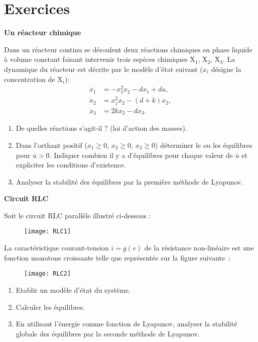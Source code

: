 \section{Exercices}

\begin{exercice}{\bf Un réacteur chimique}

Dans un réacteur continu se déroulent deux réactions chimiques en phase liquide à volume constant faisant intervenir trois espèces chimiques X$_1$, X$_2$, X$_3$. La dynamique du réacteur est décrite par le modèle d'état suivant ($x_i$ désigne la concentration de X$_i$):
\begin{align*}
\dot x_1 &= -x_1^2x_2 - dx_1 + du, \\
\dot x_2 &= x_1^2x_2 - (d+k)x_2, \\
\dot x_3 &= 2kx_2 - dx_3.
\end{align*}
\begin{enumerate}
\item De quelles réactions s'agit-il ? (loi d'action des masses). 
\item Dans l'orthant positif ($x_1 \geq 0$, $x_2 \geq 0$, $x_3 \geq 0$) déterminer le ou les équilibres pour  $\bar u > 0$. Indiquer combien il y a d'équilibres pour chaque valeur de $\bar u$ et expliciter les conditions d'existence. 
\item Analyser la stabilité des équilibres par la première méthode de Lyapunov.
\end{enumerate}
\end{exercice}
\vv

\begin{exercice}{\bf Circuit RLC}

Soit le circuit RLC parallèle illustré ci-dessous :
\begin{figure}[h]
\begin{center}
\texttt{[image: RLC1]}
\end{center}
\end{figure}

\noindent La caractéristique courant-tension $i=g(v)$ de la résistance non-linéaire est une fonction monotone croissante telle que représentée sur la figure suivante~:
\begin{figure}[h]
\begin{center}
\texttt{[image: RLC2]}
\end{center}
\end{figure}
\begin{enumerate}
\item Etablir un modèle d'état du système.
\item Calculer les équilibres.
\item En utilisant l'énergie comme fonction de Lyapunov, analyser la stabilité globale des équilibres par la seconde méthode de Lyapunov.
\end{enumerate}
\end{exercice}
\vv

